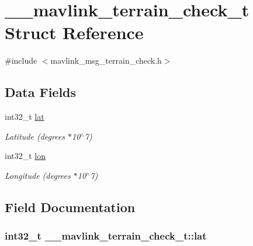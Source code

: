 \hypertarget{struct____mavlink__terrain__check__t}{\section{\+\_\+\+\_\+mavlink\+\_\+terrain\+\_\+check\+\_\+t Struct Reference}
\label{struct____mavlink__terrain__check__t}
}


{\ttfamily \#include $<$mavlink\+\_\+msg\+\_\+terrain\+\_\+check.\+h$>$}

\subsection*{Data Fields}
\begin{DoxyCompactItemize}
\item 
int32\+\_\+t \hyperlink{struct____mavlink__terrain__check__t_a5b606e3fcf8cee3e24344a2b0ed3df9d}{lat}
\begin{DoxyCompactList}\small\item\em Latitude (degrees $\ast$10$^\wedge$7) \end{DoxyCompactList}\item 
int32\+\_\+t \hyperlink{struct____mavlink__terrain__check__t_a97eba74960ff652d08651dedfadd43ea}{lon}
\begin{DoxyCompactList}\small\item\em Longitude (degrees $\ast$10$^\wedge$7) \end{DoxyCompactList}\end{DoxyCompactItemize}


\subsection{Field Documentation}
\hypertarget{struct____mavlink__terrain__check__t_a5b606e3fcf8cee3e24344a2b0ed3df9d}{
\subsubsection[{lat}]{\setlength{\rightskip}{0pt plus 5cm}int32\+\_\+t \+\_\+\+\_\+mavlink\+\_\+terrain\+\_\+check\+\_\+t\+::lat}}\label{struct____mavlink__terrain__check__t_a5b606e3fcf8cee3e24344a2b0ed3df9d}


